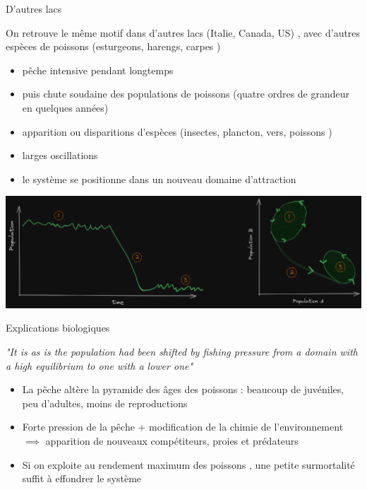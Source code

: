 \documentclass[11,aspectratio=1610]{beamer}
\begin{document}
\begin{frame}{D'autres lacs}

\begin{footnotesize}
On retrouve  le même motif dans d'autres lacs (Italie, Canada, US) , avec d'autres espèces de poissons  (esturgeons, harengs, carpes  ) 

\begin{itemize}
  \item pêche intensive pendant longtemps
  \item puis  \alert{chute soudaine} des populations de poissons (quatre ordres de grandeur en quelques années)
  \item apparition ou disparitions d'espèces (insectes, plancton, vers, poissons )
  \item larges oscillations
  \item le système se positionne dans un nouveau \alert{domaine d'attraction}
\end{itemize}
\end{footnotesize}
\centering
\includegraphics[height=0.4\textheight]{img/pattern_in_lake.png}


\end{frame}


\begin{frame}{Explications biologiques}


\textit{"It is as is the population had been shifted by fishing pressure from a domain with a high equilibrium to one with a lower one"}

\vfill

\begin{footnotesize}
\begin{itemize}
  \item La pêche altère la pyramide des âges des poissons : beaucoup de juvéniles, peu d'adultes, moins de reproductions
  \item Forte pression de la pêche + modification de la chimie de l'environnement  $\implies$ apparition de nouveaux compétiteurs, proies et prédateurs 
  \item Si on exploite au rendement maximum des poissons , une petite surmortalité suffit à \alert{effondrer le système}
\end{itemize}


\end{footnotesize}




\end{frame}
\end{document}
